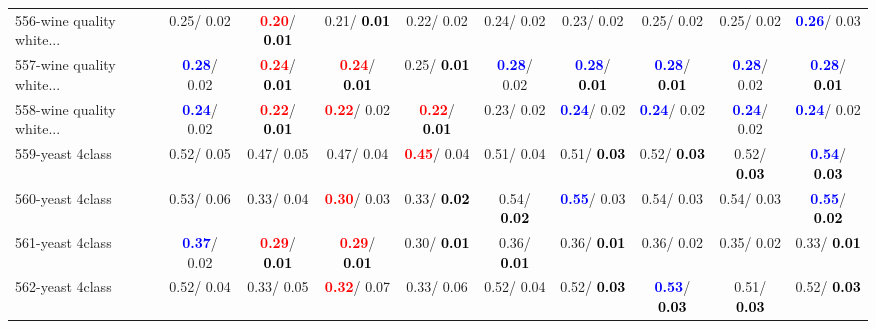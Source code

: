\begin{table}[h]
\begin{center}
{\begin{tabular}{lc|c|c|c|c|c|c|c|c}
556-wine quality white... &   0.25/  0.02 & \textcolor{red}{\textbf{  0.20}}/\textcolor{black}{\textbf{  0.01}} &   0.21/\textcolor{black}{\textbf{  0.01}} &   0.22/  0.02 &   0.24/  0.02 &   0.23/  0.02 &   0.25/  0.02 &   0.25/  0.02 & \textcolor{blue}{\textbf{  0.26}}/  0.03 \\
557-wine quality white... & \textcolor{blue}{\textbf{  0.28}}/  0.02 & \textcolor{red}{\textbf{  0.24}}/\textcolor{black}{\textbf{  0.01}} & \textcolor{red}{\textbf{  0.24}}/\textcolor{black}{\textbf{  0.01}} &   0.25/\textcolor{black}{\textbf{  0.01}} & \textcolor{blue}{\textbf{  0.28}}/  0.02 & \textcolor{blue}{\textbf{  0.28}}/\textcolor{black}{\textbf{  0.01}} & \textcolor{blue}{\textbf{  0.28}}/\textcolor{black}{\textbf{  0.01}} & \textcolor{blue}{\textbf{  0.28}}/  0.02 & \textcolor{blue}{\textbf{  0.28}}/\textcolor{black}{\textbf{  0.01}} \\
558-wine quality white... & \textcolor{blue}{\textbf{  0.24}}/  0.02 & \textcolor{red}{\textbf{  0.22}}/\textcolor{black}{\textbf{  0.01}} & \textcolor{red}{\textbf{  0.22}}/  0.02 & \textcolor{red}{\textbf{  0.22}}/\textcolor{black}{\textbf{  0.01}} &   0.23/  0.02 & \textcolor{blue}{\textbf{  0.24}}/  0.02 & \textcolor{blue}{\textbf{  0.24}}/  0.02 & \textcolor{blue}{\textbf{  0.24}}/  0.02 & \textcolor{blue}{\textbf{  0.24}}/  0.02 \\ \hline
559-yeast 4class &   0.52/  0.05 &   0.47/  0.05 &   0.47/  0.04 & \textcolor{red}{\textbf{  0.45}}/  0.04 &   0.51/  0.04 &   0.51/\textcolor{black}{\textbf{  0.03}} &   0.52/\textcolor{black}{\textbf{  0.03}} &   0.52/\textcolor{black}{\textbf{  0.03}} & \textcolor{blue}{\textbf{  0.54}}/\textcolor{black}{\textbf{  0.03}} \\
560-yeast 4class &   0.53/  0.06 &   0.33/  0.04 & \textcolor{red}{\textbf{  0.30}}/  0.03 &   0.33/\textcolor{black}{\textbf{  0.02}} &   0.54/\textcolor{black}{\textbf{  0.02}} & \textcolor{blue}{\textbf{  0.55}}/  0.03 &   0.54/  0.03 &   0.54/  0.03 & \textcolor{blue}{\textbf{  0.55}}/\textcolor{black}{\textbf{  0.02}} \\
561-yeast 4class & \textcolor{blue}{\textbf{  0.37}}/  0.02 & \textcolor{red}{\textbf{  0.29}}/\textcolor{black}{\textbf{  0.01}} & \textcolor{red}{\textbf{  0.29}}/\textcolor{black}{\textbf{  0.01}} &   0.30/\textcolor{black}{\textbf{  0.01}} &   0.36/\textcolor{black}{\textbf{  0.01}} &   0.36/\textcolor{black}{\textbf{  0.01}} &   0.36/  0.02 &   0.35/  0.02 &   0.33/\textcolor{black}{\textbf{  0.01}} \\
562-yeast 4class &   0.52/  0.04 &   0.33/  0.05 & \textcolor{red}{\textbf{  0.32}}/  0.07 &   0.33/  0.06 &   0.52/  0.04 &   0.52/\textcolor{black}{\textbf{  0.03}} & \textcolor{blue}{\textbf{  0.53}}/\textcolor{black}{\textbf{  0.03}} &   0.51/\textcolor{black}{\textbf{  0.03}} &   0.52/\textcolor{black}{\textbf{  0.03}} \\

\end{tabular}}
\end{center}
\end{table}
